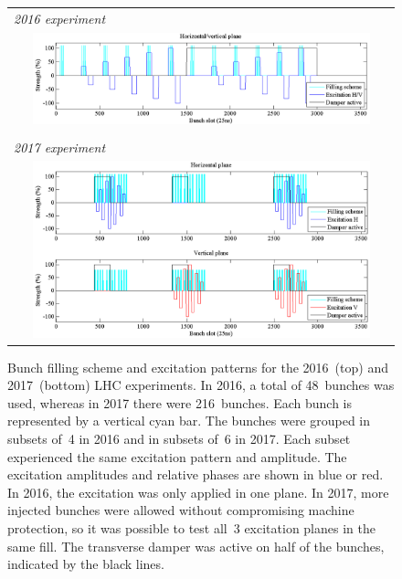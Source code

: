 \documentclass[
prstab
,reprint
,linenumbers
,longbibliography
,preprintnumbers
,showkeys
,amsfonts,amssymb,amsmath
,floatfix
]{revtex4-1}
\begin{document}
\begin{figure}
  \begin{tabular}{c}
    \multicolumn{1}{l}{\emph{2016 experiment}} \\
    \includegraphics[width=0.9\textwidth]{bunchfilling_2016.png} \\
    \\
    \multicolumn{1}{l}{\emph{2017 experiment}} \\
    \includegraphics[width=0.9\textwidth]{bunchfilling_2017.png}
  \end{tabular}
  \caption{Bunch filling scheme and excitation patterns for the
    2016~(top) and 2017~(bottom) LHC experiments. In 2016, a total of
    48~bunches was used, whereas in 2017 there were 216~bunches. Each
    bunch is represented by a vertical cyan bar. The bunches were
    grouped in subsets of~4 in 2016 and in subsets of~6 in 2017. Each
    subset experienced the same excitation pattern and amplitude. The
    excitation amplitudes and relative phases are shown in blue or
    red. In 2016, the excitation was only applied in one plane. In
    2017, more injected bunches were allowed without compromising
    machine protection, so it was possible to test all~3 excitation
    planes in the same fill. The transverse damper was active on half
    of the bunches, indicated by the black lines.}
  \label{fig:fill}
\end{figure}
\end{document}
